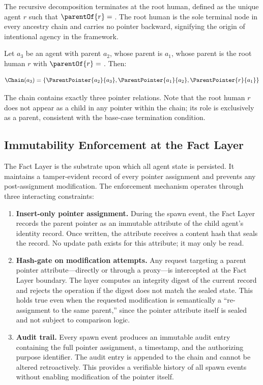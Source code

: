 The recursive decomposition terminates at the root human, defined as the unique agent $r$ such that $\parentOf{r} = \null$. The root human is the sole terminal node in every ancestry chain and carries no pointer backward, signifying the origin of intentional agency in the framework.

\begin{examplethm}
Let $a_3$ be an agent with parent $a_2$, whose parent is $a_1$, whose parent is the root human $r$ with $\parentOf{r} = \null$. Then:

\[
\Chain(a_3) = \{
    \ParentPointer{a_2}{a_3},
    \ParentPointer{a_1}{a_2},
    \ParentPointer{r}{a_1}
\}
\]

The chain contains exactly three pointer relations. Note that the root human $r$ does not appear as a child in any pointer within the chain; its role is exclusively as a parent, consistent with the base-case termination condition.
\end{examplethm}

\subsection{Immutability Enforcement at the Fact Layer}
\label{sec:immutability-enforcement}

The Fact Layer is the substrate upon which all agent state is persisted. It maintains a tamper-evident record of every pointer assignment and prevents any post-assignment modification. The enforcement mechanism operates through three interacting constraints:

\begin{enumerate}
    \item \textbf{Insert-only pointer assignment.} During the spawn event, the Fact Layer records the parent pointer as an immutable attribute of the child agent's identity record. Once written, the attribute receives a content hash that seals the record. No update path exists for this attribute; it may only be read.
    \item \textbf{Hash-gate on modification attempts.} Any request targeting a parent pointer attribute—directly or through a proxy—is intercepted at the Fact Layer boundary. The layer computes an integrity digest of the current record and rejects the operation if the digest does not match the sealed state. This holds true even when the requested modification is semantically a ``re-assignment to the same parent,'' since the pointer attribute itself is sealed and not subject to comparison logic.
    \item \textbf{Audit trail.} Every spawn event produces an immutable audit entry containing the full pointer assignment, a timestamp, and the authorizing purpose identifier. The audit entry is appended to the chain and cannot be altered retroactively. This provides a verifiable history of all spawn events without enabling modification of the pointer itself.
\end{enumerate}

